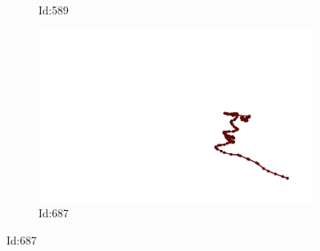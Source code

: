 \documentclass[12pt,twoside]{report}
\begin{document}
\begin{figure}
\begin{subfigure}[b]{0.20\textwidth}
\caption{Id:589}
\end{subfigure}
\begin{subfigure}[b]{0.20\textwidth}
\centering
\includegraphics[width=\textwidth]{../../trajectories/687.png}
\caption{Id:687}
\end{subfigure}
\end{figure}
\end{document}

